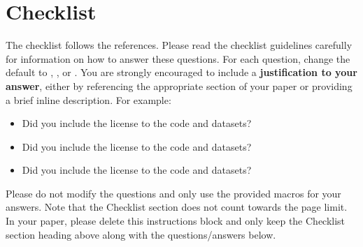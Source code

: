 
\section*{Checklist}


The checklist follows the references.  Please
read the checklist guidelines carefully for information on how to answer these
questions.  For each question, change the default \answerTODO{} to \answerYes{},
\answerNo{}, or \answerNA{}.  You are strongly encouraged to include a {\bf
justification to your answer}, either by referencing the appropriate section of
your paper or providing a brief inline description.  For example:
\begin{itemize}
  \item Did you include the license to the code and datasets? 
  \item Did you include the license to the code and datasets? 
  \item Did you include the license to the code and datasets? \answerNA{}
\end{itemize}
Please do not modify the questions and only use the provided macros for your
answers.  Note that the Checklist section does not count towards the page
limit.  In your paper, please delete this instructions block and only keep the
Checklist section heading above along with the questions/answers below.


